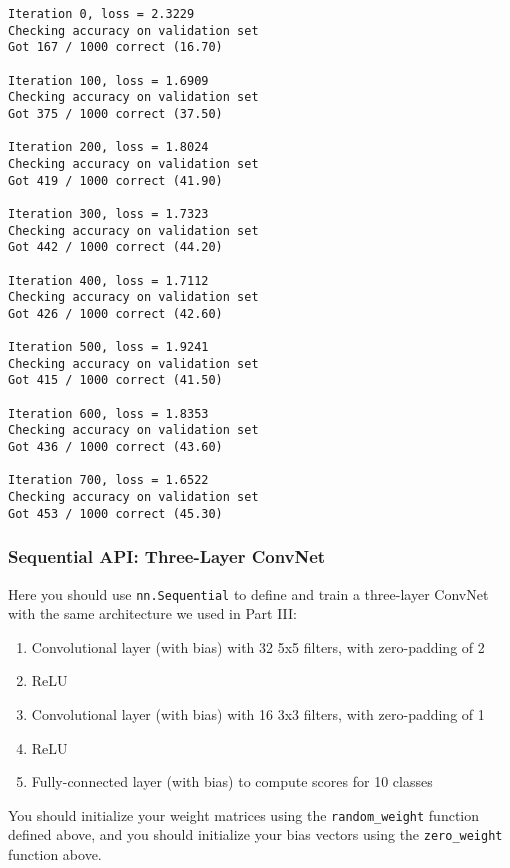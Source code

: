 \documentclass[11pt]{article}
\providecommand{\tightlist}{%
      \setlength{\itemsep}{0pt}\setlength{\parskip}{0pt}}
\begin{document}
    \begin{Verbatim}[commandchars=\\\{\}]
Iteration 0, loss = 2.3229
Checking accuracy on validation set
Got 167 / 1000 correct (16.70)

Iteration 100, loss = 1.6909
Checking accuracy on validation set
Got 375 / 1000 correct (37.50)

Iteration 200, loss = 1.8024
Checking accuracy on validation set
Got 419 / 1000 correct (41.90)

Iteration 300, loss = 1.7323
Checking accuracy on validation set
Got 442 / 1000 correct (44.20)

Iteration 400, loss = 1.7112
Checking accuracy on validation set
Got 426 / 1000 correct (42.60)

Iteration 500, loss = 1.9241
Checking accuracy on validation set
Got 415 / 1000 correct (41.50)

Iteration 600, loss = 1.8353
Checking accuracy on validation set
Got 436 / 1000 correct (43.60)

Iteration 700, loss = 1.6522
Checking accuracy on validation set
Got 453 / 1000 correct (45.30)

    \end{Verbatim}

    \hypertarget{sequential-api-three-layer-convnet}{%
\subsubsection{Sequential API: Three-Layer
ConvNet}\label{sequential-api-three-layer-convnet}}

Here you should use \texttt{nn.Sequential} to define and train a
three-layer ConvNet with the same architecture we used in Part III:

\begin{enumerate}
\def\labelenumi{\arabic{enumi}.}
\tightlist
\item
  Convolutional layer (with bias) with 32 5x5 filters, with zero-padding
  of 2
\item
  ReLU
\item
  Convolutional layer (with bias) with 16 3x3 filters, with zero-padding
  of 1
\item
  ReLU
\item
  Fully-connected layer (with bias) to compute scores for 10 classes
\end{enumerate}

You should initialize your weight matrices using the
\texttt{random\_weight} function defined above, and you should
initialize your bias vectors using the \texttt{zero\_weight} function
above.
\end{document}
